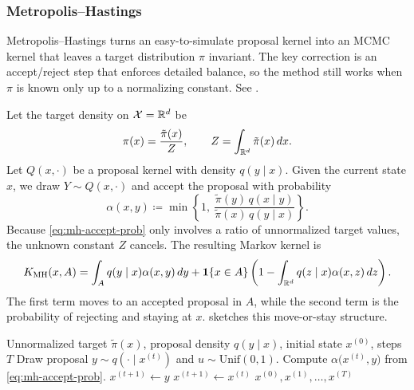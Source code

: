 \subsubsection{Metropolis--Hastings}
\label{subsec:mh}

Metropolis--Hastings turns an easy-to-simulate proposal kernel into an MCMC kernel that leaves a target distribution $\pi$ invariant.
The key correction is an accept/reject step that enforces detailed balance, so the method still works when $\pi$ is known only up to a normalizing constant.
See \citet[\S5.1--\S5.2]{liu_2002_monte_carlo}.

Let the target density on $\mathcal{X}=\mathbb{R}^d$ be
\[
  \pi(x)=\frac{\tilde\pi(x)}{Z},
  \qquad
  Z=\int_{\mathbb{R}^d}\tilde\pi(x)\,dx.
\]
Let $Q(x,\cdot)$ be a proposal kernel with density $q(y\mid x)$.
Given the current state $x$, we draw $Y\sim Q(x,\cdot)$ and accept the proposal with probability
\begin{equation}
  \alpha(x,y)
  \coloneqq
  \min\!\left\{1,\ \frac{\tilde\pi(y)\,q(x\mid y)}{\tilde\pi(x)\,q(y\mid x)}\right\}.
  \label{eq:mh-accept-prob}
\end{equation}
Because \eqref{eq:mh-accept-prob} only involves a ratio of unnormalized target values, the unknown constant $Z$ cancels.
The resulting Markov kernel is
\begin{equation}
  K_{\mathrm{MH}}(x,A)
  =
  \int_A q(y\mid x)\alpha(x,y)\,dy
  + \mathbf{1}\{x\in A\}\left(1-\int_{\mathbb{R}^d} q(z\mid x)\alpha(x,z)\,dz\right).
  \label{eq:mh-kernel}
\end{equation}
The first term moves to an accepted proposal in $A$, while the second term is the probability of rejecting and staying at $x$.
 sketches this move-or-stay structure.

\begin{algorithm}[t]
  \caption{Metropolis--Hastings}
  \label{alg:metropolis-hastings}
  \begin{algorithmic}[1]
    \Require Unnormalized target $\tilde\pi(x)$, proposal density $q(y\mid x)$, initial state $x^{(0)}$, steps $T$
      \State Draw proposal $y \sim q(\cdot\mid x^{(t)})$ and $u\sim \mathrm{Unif}(0,1)$.
      \State Compute $\alpha\bigl(x^{(t)},y\bigr)$ from \eqref{eq:mh-accept-prob}.
        \State $x^{(t+1)} \gets y$
      \Else
        \State $x^{(t+1)} \gets x^{(t)}$
      \EndIf
    \EndFor
    \State \Return $x^{(0)},x^{(1)},\dots,x^{(T)}$
  \end{algorithmic}
\end{algorithm}

